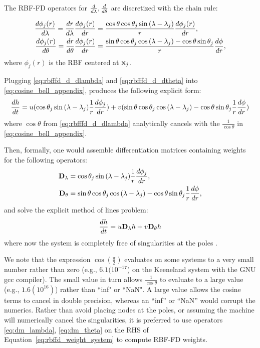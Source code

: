 The RBF-FD operators for $\frac{d }{d \lambda}, \frac{d }{d \theta}$ are discretized with the chain rule: 

\begin{align}
\frac{d \phi_{j}(r)}{d \lambda} = \frac{d r}{d \lambda} \frac{d \phi_{j}(r)}{d r} & = \frac{\cos{\theta}\cos{\theta_j}\sin{(\lambda - \lambda_j)}}{r} \frac{d \phi_j(r)}{d r}, \label{eq:rbfffd_d_dlambda} \\
\frac{d \phi_{j}(r)}{d \theta} = \frac{d r}{d \theta} \frac{d \phi_{j}(r)}{d r} & = \frac{\sin{\theta}\cos{\theta_j}\cos{(\lambda-\lambda_j)} - \cos{\theta}\sin{\theta_j}}{r} \frac{d \phi}{d r}, \label{eq:rbfffd_d_dtheta}
\end{align}
where $\phi_{j}(r)$ is the RBF centered at $\mathbf{x}_{j}$. 

Plugging \ref{eq:rbfffd_d_dlambda} and \ref{eq:rbfffd_d_dtheta} into \ref{eq:cosine_bell_appendix}, produces the following explicit form: 
\begin{align*}
\frac{d h}{d t} = u(\cos{\theta_j}\sin{(\lambda - \lambda_j)} \frac{1}{r} \frac{d \phi_j}{d r}) + v (\sin{\theta}\cos{\theta_j}\cos{(\lambda-\lambda_j)} - \cos{\theta}\sin{\theta_j} \frac{1}{r} \frac{d \phi}{d r}) 
\end{align*}
where $\cos{\theta}$ from \ref{eq:rbfffd_d_dlambda} analytically cancels with the $\frac{1}{\cos{\theta}}$ in \ref{eq:cosine_bell_appendix}.


Then, formally, one would assemble differentiation matrices containing weights for the following operators: 
\begin{align}
\mathbf{D}_\lambda & = \cos{\theta_j}\sin{(\lambda - \lambda_j)} \frac{1}{r} \frac{d \phi_j}{d r}, \label{eq:dm_lambda} \\
\mathbf{D}_\theta &=  \sin{\theta}\cos{\theta_j}\cos{(\lambda-\lambda_j)} - \cos{\theta}\sin{\theta_j} \frac{1}{r} \frac{d \phi}{d r}, \label{eq:dm_theta}
\end{align} 
and solve the explicit method of lines problem:
$$
\frac{d h}{d t} = u \mathbf{D}_\lambda h + v \mathbf{D}_\theta h
$$
where now the system is completely free of singularities at the poles \cite{FlyerWright09}. 

We note that the expression $\cos{(\frac{\pi}{2})}$ evaluates on some systems to a very small number rather than zero (e.g., $6.1(10^{-17}$) on the Keeneland system with the GNU gcc compiler). The small value in turn allows $\frac{1}{\cos{\theta}}$ to evaluate to a large value (e.g., $1.6(10^{16})$) rather than ``inf" or ``NaN". A large value allows the cosine terms to cancel in double precision, whereas an ``inf'' or ``NaN'' would corrupt the numerics. Rather than avoid placing nodes at the poles, or assuming the machine will numerically cancel the singularities, it is preferred to use operators \ref{eq:dm_lambda}, \ref{eq:dm_theta} on the RHS of Equation~\ref{eq:rbffd_weight_system} to compute RBF-FD weights. 

%
%
%
%
